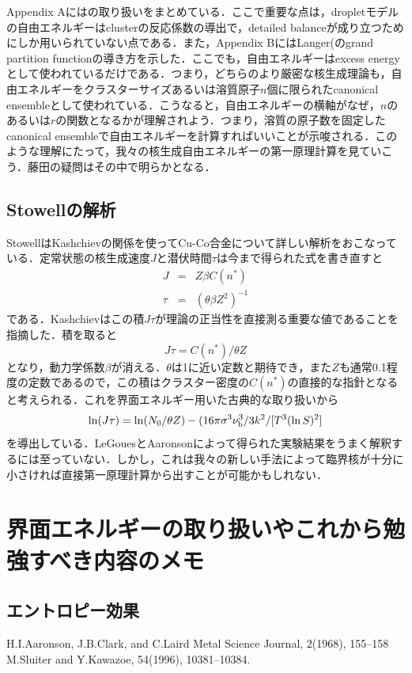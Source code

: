 \documentclass[a4j,10pt]{jarticle}
\begin{document}
Appendix Aには\cite{BeckerDoring:1935}の取り扱いをまとめている．ここで重要な点は，dropletモデルの自由エネルギーはclusterの反応係数の導出で，detailed balanceが成り立つためにしか用いられていない点である．また，Appendix BにはLanger(\cite{Langer:1967,Langer:1969}のgrand partition functionの導き方を示した．ここでも，自由エネルギーはexcess energyとして使われているだけである．つまり，どちらのより厳密な核生成理論も，自由エネルギーをクラスターサイズあるいは溶質原子$n$個に限られたcanonical ensembleとして使われている．こうなると，自由エネルギーの横軸がなぜ，$n$のあるいは$r$の関数となるかが理解されよう．つまり，溶質の原子数を固定したcanonical ensembleで自由エネルギーを計算すればいいことが示唆される．このような理解にたって，我々の核生成自由エネルギーの第一原理計算を見ていこう．藤田の疑問はその中で明らかとなる．
\iffalse
\subsection{Stowellの解析}
StowellはKashchievの関係を使ってCu-Co合金について詳しい解析をおこなっている．定常状態の核生成速度$J$と潜伏時間$\tau$は今まで得られた式を書き直すと
\begin{eqnarray}
J&=&Z\beta C(n^*) \\
\tau &=& (\theta \beta Z^2)^{-1}
\end{eqnarray}
である．Kashchievはこの積$J\tau$が理論の正当性を直接測る重要な値であることを指摘した．積を取ると
\begin{equation}
J\tau = C(n^*)/\theta Z
\end{equation}
となり，動力学係数$\beta$が消える．$\theta$は1に近い定数と期待でき，また$Z$も通常0.1程度の定数であるので，この積はクラスター密度の$C(n^*)$の直接的な指針となると考えられる．これを界面エネルギー用いた古典的な取り扱いから
\begin{equation}
\ln(J\tau) = \ln(N_0/\theta Z) - (16 \pi \sigma^3 \nu_{\rm b}^3/3k^2/[ T^3(\ln S)^2 ]
\end{equation}
を導出している．LeGouesとAaronsonによって得られた実験結果をうまく解釈するには至っていない．しかし，これは我々の新しい手法によって臨界核が十分に小さければ直接第一原理計算から出すことが可能かもしれない．

\section{界面エネルギーの取り扱いやこれから勉強すべき内容のメモ}
\subsection{エントロピー効果}
H.I.Aaronson, J.B.Clark, and C.Laird
Metal Science Journal, 2(1968), 155--158
M.Sluiter and Y.Kawazoe, 54(1996), 10381--10384.
\end{document}
